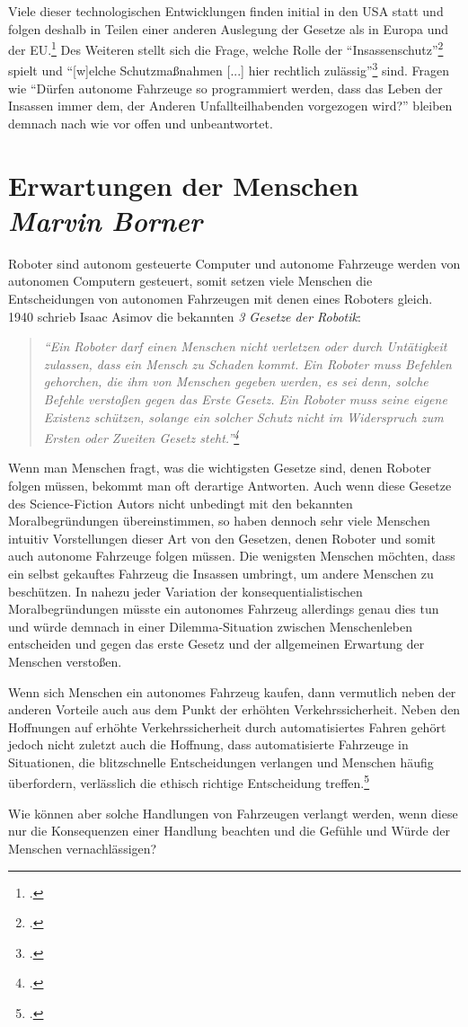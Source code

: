\documentclass[a4paper, 12pt, openany]{book}
\newcommand\Section[2]{\section[#1 {\scriptsize\itshape#2}]{#1 \footnotesize\itshape#2}}
\begin{document}
            Viele dieser technologischen Entwicklungen finden initial in den USA statt und folgen deshalb in Teilen einer anderen Auslegung der Gesetze als in Europa und der EU.\footcite[676]{hilgendorf2018dilemma}
            Des Weiteren stellt sich die Frage, welche Rolle der \enquote{Insassenschutz}\footcite[49]{hilgendorf2017dilemma} spielt und \enquote{[w]elche Schutzmaßnahmen [...] hier rechtlich zulässig}\footcite[49]{hilgendorf2017dilemma} sind. Fragen wie \enquote{Dürfen autonome Fahrzeuge so programmiert werden, dass das Leben der Insassen immer dem, der Anderen Unfallteilhabenden vorgezogen wird?} bleiben demnach nach wie vor offen und unbeantwortet.

        \Section{Erwartungen der Menschen}{Marvin Borner}
            Roboter sind autonom gesteuerte Computer und autonome Fahrzeuge werden von autonomen Computern gesteuert, somit setzen viele Menschen die Entscheidungen von autonomen Fahrzeugen mit denen eines Roboters gleich. 1940 schrieb Isaac Asimov die bekannten \textit{3 Gesetze der Robotik}:
            \begin{quote}
                \centering 
                \textit{\enquote{Ein Roboter darf einen Menschen nicht verletzen oder durch Untätigkeit zulassen, dass ein Mensch zu Schaden kommt. Ein Roboter muss Befehlen gehorchen, die ihm von Menschen gegeben werden, es sei denn, solche Befehle verstoßen gegen das Erste Gesetz. Ein Roboter muss seine eigene Existenz schützen, solange ein solcher Schutz nicht im Widerspruch zum Ersten oder Zweiten Gesetz steht.}\footcite[229]{asimov2011alle}}
            \end{quote}\par
            Wenn man Menschen fragt, was die wichtigsten Gesetze sind, denen Roboter folgen müssen, bekommt man oft derartige Antworten. Auch wenn diese Gesetze des Science-Fiction Autors nicht unbedingt mit den bekannten Moralbegründungen übereinstimmen, so haben dennoch sehr viele Menschen intuitiv Vorstellungen dieser Art von den Gesetzen, denen Roboter und somit auch autonome Fahrzeuge folgen müssen. Die wenigsten Menschen möchten, dass ein selbst gekauftes Fahrzeug die Insassen umbringt, um andere Menschen zu beschützen. In nahezu jeder Variation der konsequentialistischen Moralbegründungen müsste ein autonomes Fahrzeug allerdings genau dies tun und würde demnach in einer Dilemma-Situation zwischen Menschenleben entscheiden und gegen das erste Gesetz und der allgemeinen Erwartung der Menschen verstoßen.\par
            Wenn sich Menschen ein autonomes Fahrzeug kaufen, dann vermutlich neben der anderen Vorteile auch aus dem Punkt der erhöhten Verkehrssicherheit. Neben den Hoffnungen auf erhöhte Verkehrssicherheit durch automatisiertes Fahren gehört jedoch nicht zuletzt auch die Hoffnung, dass automatisierte Fahrzeuge in Situationen, die blitzschnelle Entscheidungen verlangen und Menschen häufig überfordern, verlässlich die ethisch richtige Entscheidung treffen.\footcite[4]{birnbacher2016automatisiertes}\par
            Wie können aber solche Handlungen von Fahrzeugen verlangt werden, wenn diese nur die Konsequenzen einer Handlung beachten und die Gefühle und Würde der Menschen vernachlässigen?
\end{document}
